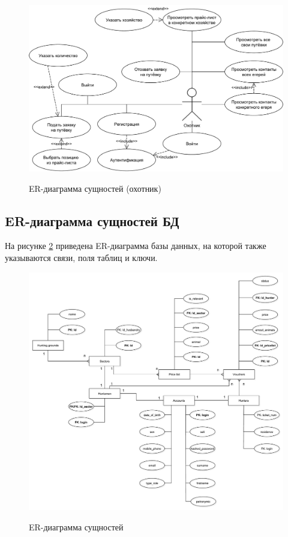 	\begin{figure}[ph!]
		\centering
		\begin{center}
			{\includegraphics[scale=0.45]{schemes/use-case_hunter.pdf}}
			\caption{ER-диаграмма сущностей (охотник)}
			\label{fig4:image}
		\end{center}
	\end{figure}
	
	\newpage
	
	\subsection{ER-диаграмма сущностей БД}
	На рисунке \ref{fig5:image} приведена ER-диаграмма базы данных, на которой также указываются связи, поля таблиц и ключи.
	
	\begin{figure}[ph!]
		\centering
		\begin{center}
			{\includegraphics[scale=0.47]{schemes/ERclassic.pdf}}
			\caption{ER-диаграмма сущностей}
			\label{fig5:image}
		\end{center}
	\end{figure}

